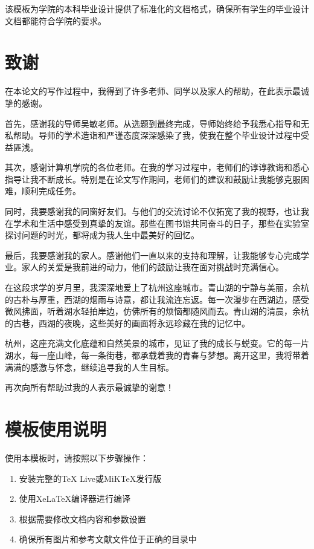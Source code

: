 \documentclass
  [
    math-font    = STIX Two Math, agreed,
    CJKmain-font = { {Songti SC}[AutoFakeBold = 2.5, AutoFakeSlant] },
    CJKsans-font = { {STHeiti}[AutoFakeBold = 2] }
  ] {hduthesis}
\begin{document}
该模板为学院的本科毕业设计提供了标准化的文档格式，确保所有学生的毕业设计文档都能符合学院的要求。

\chapter*{致谢}

在本论文的写作过程中，我得到了许多老师、同学以及家人的帮助，在此表示最诚挚的感谢。

首先，感谢我的导师吴敏老师。从选题到最终完成，导师始终给予我悉心指导和无私帮助。导师的学术造诣和严谨态度深深感染了我，使我在整个毕业设计过程中受益匪浅。

其次，感谢计算机学院的各位老师。在我的学习过程中，老师们的谆谆教诲和悉心指导让我不断成长。特别是在论文写作期间，老师们的建议和鼓励让我能够克服困难，顺利完成任务。

同时，我要感谢我的同窗好友们。与他们的交流讨论不仅拓宽了我的视野，也让我在学术和生活中感受到真挚的友谊。那些在图书馆共同奋斗的日子，那些在实验室探讨问题的时光，都将成为我人生中最美好的回忆。

最后，我要感谢我的家人。感谢他们一直以来的支持和理解，让我能够专心完成学业。家人的关爱是我前进的动力，他们的鼓励让我在面对挑战时充满信心。

在这段求学的岁月里，我深深地爱上了杭州这座城市。青山湖的宁静与美丽，余杭的古朴与厚重，西湖的烟雨与诗意，都让我流连忘返。每一次漫步在西湖边，感受微风拂面，听着湖水轻拍岸边，仿佛所有的烦恼都随风而去。青山湖的清晨，余杭的古巷，西湖的夜晚，这些美好的画面将永远珍藏在我的记忆中。

杭州，这座充满文化底蕴和自然美景的城市，见证了我的成长与蜕变。它的每一片湖水，每一座山峰，每一条街巷，都承载着我的青春与梦想。离开这里，我将带着满满的感激与怀念，继续追寻我的人生目标。

再次向所有帮助过我的人表示最诚挚的谢意！



\appendix

\chapter{模板使用说明}

使用本模板时，请按照以下步骤操作：

\begin{enumerate}
\item 安装完整的TeX Live或MiKTeX发行版
\item 使用XeLaTeX编译器进行编译
\item 根据需要修改文档内容和参数设置
\item 确保所有图片和参考文献文件位于正确的目录中
\end{enumerate}
\end{document}
